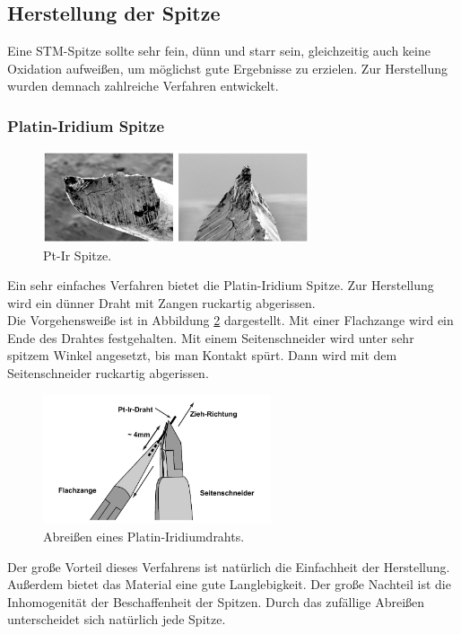     \subsection{Herstellung der Spitze}

Eine STM-Spitze sollte sehr fein, dünn und starr sein, gleichzeitig auch keine 
Oxidation aufweißen, um möglichst gute Ergebnisse zu erzielen. Zur Herstellung 
wurden demnach zahlreiche Verfahren entwickelt. 

        \subsubsection{Platin-Iridium Spitze}

\begin{figure}[h]
    \centering
    \includegraphics[width=0.7\textwidth]{Abb/pt-ir.png}
    \caption{Pt-Ir Spitze. \cite{nanosurf}}
    \label{ptir}
\end{figure}
Ein sehr einfaches Verfahren bietet die Platin-Iridium Spitze. Zur Herstellung wird
ein dünner Draht mit Zangen ruckartig abgerissen.\\
Die Vorgehensweiße ist in Abbildung \ref{ptirverf} dargestellt. Mit einer Flachzange
wird ein Ende des Drahtes festgehalten. Mit einem Seitenschneider wird unter sehr 
spitzem Winkel angesetzt, bis man Kontakt spürt. Dann wird mit dem Seitenschneider
ruckartig abgerissen.
\begin{figure}
    \centering
    \includegraphics[width=0.6\textwidth]{Abb/pt-it-verf.png}
    \caption{Abreißen eines Platin-Iridiumdrahts. \cite{nanosurf}}
    \label{ptirverf}
\end{figure}
Der große Vorteil dieses Verfahrens ist natürlich die Einfachheit der Herstellung.
Außerdem bietet das Material eine gute Langlebigkeit. Der große Nachteil ist die
Inhomogenität der Beschaffenheit der Spitzen. Durch das zufällige Abreißen 
unterscheidet sich natürlich jede Spitze.

